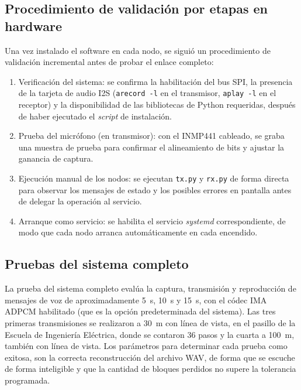 \subsection{Procedimiento de validación por etapas en hardware}

Una vez instalado el software en cada nodo, se siguió un procedimiento de validación incremental antes de probar el enlace completo:

\begin{enumerate}
    \item Verificación del sistema: se confirma la habilitación del bus SPI, la presencia de la tarjeta de audio I2S (\texttt{arecord -l} en el transmisor, \texttt{aplay -l} en el receptor) y la disponibilidad de las bibliotecas de Python requeridas, después de haber ejecutado el \textit{script} de instalación.
    \item Prueba del micrófono (en transmisor): con el INMP441 cableado, se graba una muestra de prueba para confirmar el alineamiento de bits y ajustar la ganancia de captura.
    \item Ejecución manual de los nodos: se ejecutan \texttt{tx.py} y \texttt{rx.py} de forma directa para observar los mensajes de estado y los posibles errores en pantalla antes de delegar la operación al servicio.
    \item Arranque como servicio: se habilita el servicio \textit{systemd} correspondiente, de modo que cada nodo arranca automáticamente en cada encendido.
\end{enumerate}

\subsection{Pruebas del sistema completo}

La prueba del sistema completo evalúa la captura, transmisión y reproducción de mensajes de voz de aproximadamente \SI{5}{\second}, \SI{10}{\second}  y \SI{15}{\second}, con el códec IMA ADPCM habilitado (que es la opción predeterminada del sistema).
Las tres primeras transmisiones se realizaron a \SI{30}{\meter} con línea de vista, en el pasillo de la Escuela de Ingeniería Eléctrica, donde se contaron 36 pasos y la cuarta a \SI{100}{\meter}, también con línea de vista.
Los parámetros para determinar cada prueba como exitosa, son la correcta reconstrucción del archivo WAV, de forma que se escuche de forma inteligible y que la cantidad de bloques perdidos no supere la tolerancia programada.

